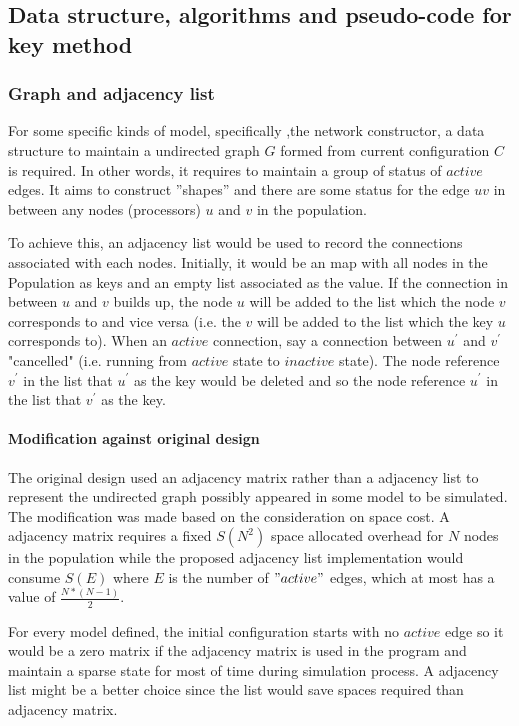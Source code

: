 \subsection{Data structure, algorithms and pseudo-code for key method}
\subsubsection{Graph and adjacency list}
\par\noindent
For some specific kinds of model, specifically ,the network constructor, a data
structure to maintain a undirected graph $G$ formed from current configuration $C$ is required. In other words, it requires to maintain
a group of status of $active$ edges. It aims to construct ”shapes”
and there are some status for the edge $uv$ in between any nodes (processors) $u$
and $v$ in the population.

\par\noindent
To achieve this, an adjacency list would be used to record the connections associated
with each nodes. Initially, it would be an map with all nodes in the Population
as keys and an empty list associated as the value. If the connection in between $u$ and $v$ builds up,
the node $u$ will be added to the list which the node $v$ corresponds to and vice versa
(i.e. the $v$ will be added to the list which the key $u$ corresponds to). When an $active$
connection, say a connection between $u^{'}$ and $v^{'}$ "cancelled" (i.e.
running from $active$ state to $inactive$ state). The node reference $v^{'}$ in the list that
$u^{'}$ as the key would be deleted and so the node reference $u^{'}$ in the list that
$v^{'}$ as the key.

\paragraph{Modification against original design}
The original design used an adjacency matrix rather than a adjacency list to represent the
undirected graph possibly appeared in some model to be simulated. The modification was made based on
the consideration on space cost. A adjacency matrix requires a fixed $S(N^{2})$ space allocated overhead
for $N$ nodes in the population while the proposed adjacency list implementation would consume $S(E)$ where
$E$ is the number of $"active"$ edges, which at most has a value of $\frac{N * (N - 1)}{2}$.


\par\noindent
For every model defined, the initial configuration starts with no $active$ edge so it would be a zero matrix if
the adjacency matrix is used in the program and maintain a sparse state for most of time during simulation process.
A adjacency list might be a better choice since the list would save spaces required than adjacency matrix.

